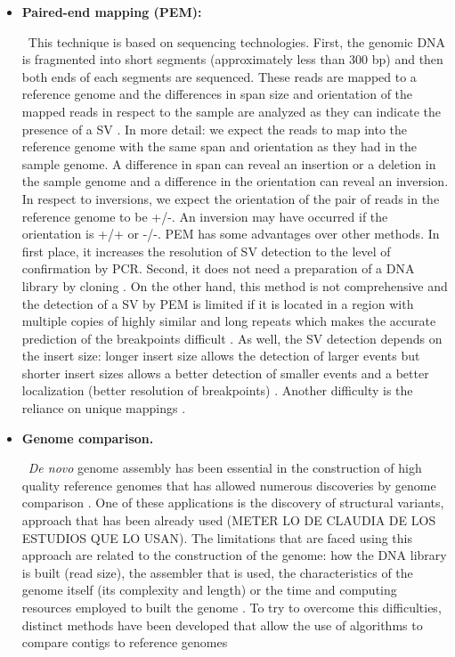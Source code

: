 \documentclass{article}
\begin{document}
\begin{itemize}
\item {\bf Paired-end mapping (PEM):} 

\
This technique is based on sequencing technologies. First, the genomic DNA is fragmented into short segments (approximately less than 300 bp) and then both ends of each segments are sequenced. These reads are mapped to a reference genome and the differences in span size and orientation of the mapped reads in respect to the sample are analyzed as they can indicate the presence of a SV \cite{alkan_genome_2011, korbel_paired-end_2007, medvedev_computational_2009}. In more detail: we expect the reads to map into the reference genome with the same span and orientation as they had in the sample genome. A difference in span can reveal an insertion or a deletion in the sample genome and a difference in the orientation can reveal an inversion. In respect to inversions, we expect the orientation of the pair of reads in the reference genome to be +/-. An inversion may have occurred if the orientation is +/+ or -/-. 
PEM has some advantages over other methods. In first place, it increases the resolution of SV detection to the level of confirmation by PCR. Second, it does not need a preparation of a DNA library by cloning \cite{korbel_paired-end_2007}. On the other hand, this method is not comprehensive \cite{alkan_genome_2011} and the detection of a SV by PEM is limited if it is located in a region with multiple copies of highly similar and long repeats which makes the accurate prediction of the breakpoints difficult \cite{alkan_genome_2011, medvedev_computational_2009,korbel_paired-end_2007}. As well, the SV detection depends on the insert size: longer insert size allows the detection of larger events but shorter insert sizes allows a better detection of smaller events and a better localization (better resolution of breakpoints) \cite{medvedev_computational_2009}. Another difficulty is the reliance on unique mappings \cite{medvedev_computational_2009}.

\item {\bf Genome comparison.} 

\
{\em De novo} genome assembly has been essential in the construction of high quality reference genomes that has allowed numerous discoveries by genome comparison \cite{chin_phased_2016}. One of these applications is the discovery of structural variants, approach that has been already used (METER LO DE CLAUDIA DE LOS ESTUDIOS QUE LO USAN). The limitations that are faced using this approach are related to the construction of the genome: how the DNA library is built (read size), the assembler that is used, the characteristics of the genome itself (its complexity and length) or the time and computing resources employed to built the genome \cite{baker_novo_2012}. To try to overcome this difficulties, distinct methods have been developed that allow the use of algorithms  to compare contigs to reference genomes


\end{itemize}
\end{document}
